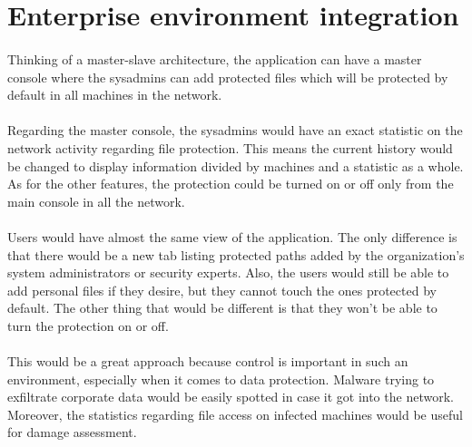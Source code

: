 \section{Enterprise environment integration}
\paragraph{}
Thinking of a master-slave architecture, the application can have a master console where the sysadmins can add protected files which will be protected by default in all machines in the network. 

\paragraph{}
Regarding the master console, the sysadmins would have an exact statistic on the network activity regarding file protection. This means the current history would be changed to display information divided by machines and a statistic as a whole. As for the other features, the protection could be turned on or off only from the main console in all the network.

\paragraph{}
Users would have almost the same view of the application. The only difference is that there would be a new tab listing protected paths added by the organization's system administrators or security experts. Also, the users would still be able to add personal files if they desire, but they cannot touch the ones protected by default. The other thing that would be different is that they won't be able to turn the protection on or off.

\paragraph{}
This would be a great approach because control is important in such an environment, especially when it comes to data protection. Malware trying to exfiltrate corporate data would be easily spotted in case it got into the network. Moreover, the statistics regarding file access on infected machines would be useful for damage assessment.


